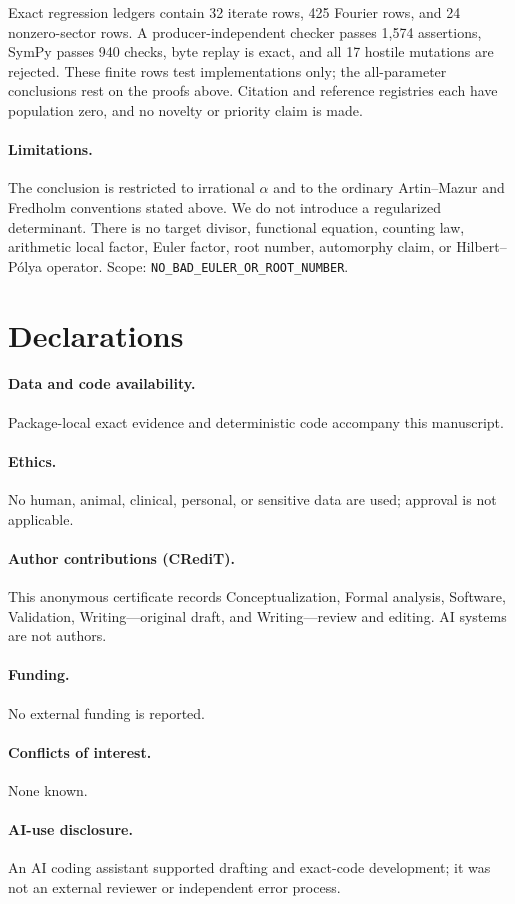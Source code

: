 \documentclass[10pt]{article}
\begin{document}
Exact regression ledgers contain 32 iterate rows, 425 Fourier rows, and 24
nonzero-sector rows.  A producer-independent checker passes 1{,}574
assertions, SymPy passes 940 checks, byte replay is exact, and all 17 hostile
mutations are rejected.  These finite rows test implementations only; the
all-parameter conclusions rest on the proofs above.  Citation and reference
registries each have population zero, and no novelty or priority claim is
made.

\paragraph{Limitations.}
The conclusion is restricted to irrational $\alpha$ and to the ordinary
Artin--Mazur and Fredholm conventions stated above.  We do not introduce a
regularized determinant.  There is no target divisor, functional equation,
counting law, arithmetic local factor, Euler factor, root number, automorphy
claim, or Hilbert--P\'olya operator.  Scope:
\texttt{NO\_BAD\_EULER\_OR\_ROOT\_NUMBER}.

\section*{Declarations}
\paragraph{Data and code availability.} Package-local exact evidence and
deterministic code accompany this manuscript.
\paragraph{Ethics.} No human, animal, clinical, personal, or sensitive data
are used; approval is not applicable.
\paragraph{Author contributions (CRediT).} This anonymous certificate records
Conceptualization, Formal analysis, Software, Validation, Writing---original
draft, and Writing---review and editing.  AI systems are not authors.
\paragraph{Funding.} No external funding is reported.
\paragraph{Conflicts of interest.} None known.
\paragraph{AI-use disclosure.} An AI coding assistant supported drafting and
exact-code development; it was not an external reviewer or independent error
process.
\end{document}
